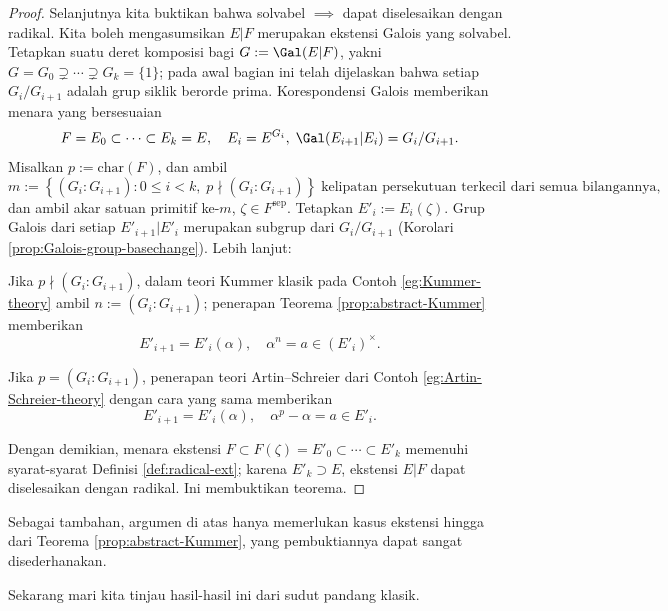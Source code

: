 \begin{proof}
	Selanjutnya kita buktikan bahwa solvabel $\implies$ dapat diselesaikan dengan radikal. Kita boleh mengasumsikan $E|F$ merupakan ekstensi Galois yang solvabel. Tetapkan suatu deret komposisi bagi $G := \Gal(E|F)$, yakni $G = G_0 \supsetneq \cdots \supsetneq G_k = \{1\}$; pada awal bagian ini telah dijelaskan bahwa setiap $G_i/G_{i+1}$ adalah grup siklik berorde prima. Korespondensi Galois memberikan menara yang bersesuaian
	\[ F = E_0 \subset \cdots \subset E_k = E, \quad E_i = E^{G_i},\; \Gal(E_{i+1}|E_i) = G_i/G_{i+1}. \]
	Misalkan $p := \text{char}(F)$, dan ambil
	\[ m := \left\{ (G_i:G_{i+1}) : 0 \leq i < k, \; p \nmid (G_i : G_{i+1}) \right\} \; \text{kelipatan persekutuan terkecil dari semua bilangannya}, \]
	dan ambil akar satuan primitif ke-$m$, $\zeta \in F^{\text{sep}}$. Tetapkan $E'_i := E_i(\zeta)$. Grup Galois dari setiap $E'_{i+1} | E'_i$ merupakan subgrup dari $G_i/G_{i+1}$ (Korolari \ref{prop:Galois-group-basechange}). Lebih lanjut:
	\begin{compactitem}
		\item Jika $p \nmid (G_i : G_{i+1})$, dalam teori Kummer klasik pada Contoh \ref{eg:Kummer-theory} ambil $n := (G_i : G_{i+1})$; penerapan Teorema \ref{prop:abstract-Kummer} memberikan
			\[ E'_{i+1} = E'_i(\alpha), \quad \alpha^n = a \in (E'_i)^\times. \]
		\item Jika $p = (G_i : G_{i+1})$, penerapan teori Artin--Schreier dari Contoh \ref{eg:Artin-Schreier-theory} dengan cara yang sama memberikan
			\[ E'_{i+1} = E'_i(\alpha), \quad \alpha^p - \alpha = a \in E'_i. \]
	\end{compactitem}
	Dengan demikian, menara ekstensi $F \subset F(\zeta)=E'_0 \subset \cdots \subset E'_k$ memenuhi syarat-syarat Definisi \ref{def:radical-ext}; karena $E'_k \supset E$, ekstensi $E|F$ dapat diselesaikan dengan radikal. Ini membuktikan teorema.
\end{proof}
Sebagai tambahan, argumen di atas hanya memerlukan kasus ekstensi hingga dari Teorema \ref{prop:abstract-Kummer}, yang pembuktiannya dapat sangat disederhanakan.

Sekarang mari kita tinjau hasil-hasil ini dari sudut pandang klasik.

